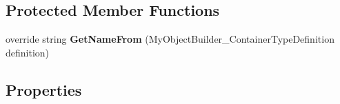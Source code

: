 \subsection*{Protected Member Functions}
\begin{DoxyCompactItemize}
\item 
\hypertarget{class_s_e_mod_a_p_i_1_1_a_p_i_1_1_definitions_1_1_container_types_definition_ad3f99887dcdb097ad2993af7c201542d}{}override string {\bfseries Get\+Name\+From} (My\+Object\+Builder\+\_\+\+Container\+Type\+Definition definition)\label{class_s_e_mod_a_p_i_1_1_a_p_i_1_1_definitions_1_1_container_types_definition_ad3f99887dcdb097ad2993af7c201542d}

\end{DoxyCompactItemize}
\subsection*{Properties}
